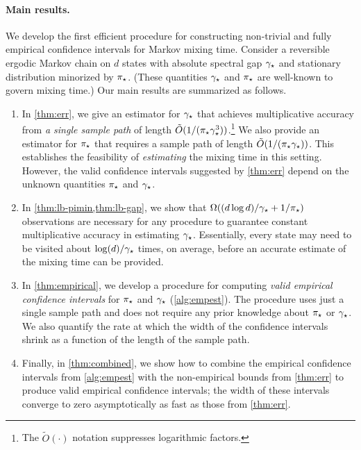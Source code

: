 \paragraph{Main results.}
We develop the first efficient procedure for constructing non-trivial
and fully empirical confidence intervals for Markov mixing time.
Consider a reversible ergodic Markov chain on $d$ states with absolute
spectral gap $\gamma_{\star}$ and stationary distribution minorized by $\pi_{\star}$.
(These quantities $\gamma_{\star}$ and $\pi_{\star}$ are well-known to govern
mixing time.)
Our main results are summarized as follows.
\begin{enumerate}
  \item
    In \cref{thm:err}, we give an estimator for $\gamma_{\star}$ that
    achieves multiplicative accuracy from \emph{a single sample path}
    of length $\tilde{O}(1/(\pi_{\star}\gamma_{\star}^3))$.\footnote{The
    $\tilde{O}(\cdot)$ notation suppresses logarithmic factors.}
    We also provide an estimator for $\pi_{\star}$ that requires a sample
    path of length $\tilde{O}(1/(\pi_{\star}\gamma_{\star}))$.
    This establishes the feasibility of \emph{estimating} the mixing
    time in this setting.
    However, the valid confidence intervals suggested by
    \cref{thm:err} depend on the unknown quantities $\pi_{\star}$ and
    $\gamma_{\star}$.

  \item
    In \cref{thm:lb-pimin,thm:lb-gap}, we show that $\Omega(
    (d\log d)/\gamma_{\star} + 1/\pi_{\star})$ observations are necessary for any
    procedure to guarantee constant multiplicative accuracy in
    estimating $\gamma_{\star}$.
    Essentially, every state may need to be visited about
    $\log(d)/\gamma_{\star}$ times, on average, before an accurate estimate of
    the mixing time can be provided.

  \item
    In \cref{thm:empirical}, we develop a procedure for computing
    \emph{valid empirical confidence intervals} for $\pi_{\star}$ and
    $\gamma_{\star}$ (\cref{alg:empest}).
    The procedure uses just a single sample path and does not require
    any prior knowledge about $\pi_{\star}$ or $\gamma_{\star}$.
    We also quantify the rate at which the width of the confidence
    intervals shrink as a function of the length of the sample path.

  \item
    Finally, in \cref{thm:combined}, we show how to combine the
    empirical confidence intervals from \cref{alg:empest} with the
    non-empirical bounds from \cref{thm:err} to produce valid
    empirical confidence intervals;
    the width of these intervals converge to zero asymptotically as
    fast as those from \cref{thm:err}.



    

\end{enumerate}

